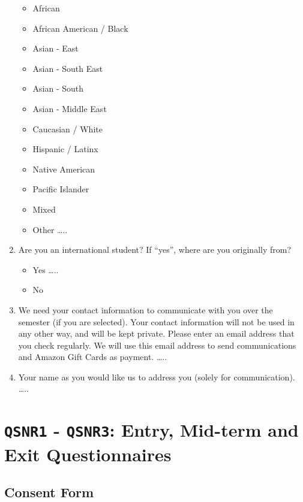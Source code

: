 \documentclass[letterpaper, nobind]{templates/ociamthesis}
\providecommand{\tightlist}{%
  \setlength{\itemsep}{0pt}\setlength{\parskip}{0pt}}
\begin{document}
\begin{enumerate}
  \begin{itemize}
  \tightlist
  \item
    African
  \item
    African American / Black
  \item
    Asian - East
  \item
    Asian - South East
  \item
    Asian - South
  \item
    Asian - Middle East
  \item
    Caucasian / White
  \item
    Hispanic / Latinx
  \item
    Native American
  \item
    Pacific Islander
  \item
    Mixed
  \item
    Other \ldots..
  \end{itemize}
\item
  Are you an international student? If ``yes'', where are you originally from?

  \begin{itemize}
  \tightlist
  \item
    Yes \ldots..
  \item
    No
  \end{itemize}
\item
  We need your contact information to communicate with you over the semester (if you are selected). Your contact information will not be used in any other way, and will be kept private. Please enter an email address that you check regularly. We will use this email address to send communications and Amazon Gift Cards as payment.
  \ldots..
\item
  Your name as you would like us to address you (solely for communication).
  \ldots..
\end{enumerate}

\hypertarget{qsnr1---qsnr3-entry-mid-term-and-exit-questionnaires}{%
\section{\texorpdfstring{\texttt{QSNR1} - \texttt{QSNR3}: Entry, Mid-term and Exit Questionnaires}{QSNR1 - QSNR3: Entry, Mid-term and Exit Questionnaires}}\label{qsnr1---qsnr3-entry-mid-term-and-exit-questionnaires}}

\hypertarget{app-qsnr-consent-form}{%
\subsection{Consent Form}\label{app-qsnr-consent-form}}
\end{document}
